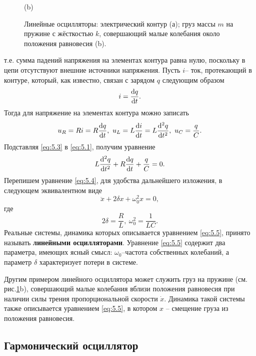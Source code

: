 \begin{figure}[h!]
\begin{minipage}{0.45\linewidth}
                (b)      
        \end{minipage}
        \caption{Линейные осцилляторы: электрический контур (а); груз массы $m$ на пружине с жёсткостью $k$, совершающий малые колебания около положения равновесия (b).}
        \label{fig:5.1}
\end{figure}
т.е. сумма падений напряжения на элементах контура равна нулю, поскольку в цепи отсутствуют внешние источники напряжения. Пусть $i$-- ток, протекающий в контуре, который, как известно, связан с зарядом $q$ следующим образом
\begin{equation}
        \label{eq:5.2}
        i = \dv{q}{t}.
\end{equation}
Тогда для напряжение на элементах контура можно записать
\begin{equation}
        \label{eq:5.3}
        u_R = Ri = R \dv{q}{t}, ~ u_L = L \dv{i}{t} = L \dv[2]{q}{t},~ u_C= \frac{q}{C}.
\end{equation}
Подставляя \eqref{eq:5.3} в \eqref{eq:5.1}, получим уравнение
\begin{equation}
        \label{eq:5.4}
        L\dv[2]{q}{t} + R \dv{q}{t} + \frac{q}{C} = 0.
\end{equation}
Перепишем уравнение \eqref{eq:5.4}, для удобства дальнейшего изложения, в следующем эквивалентном виде
\begin{equation}
        \label{eq:5.5}
        \ddot x + 2 \delta x + \omega_0^2 x =0,
\end{equation}
где 
\begin{equation}
        \label{eq:}
        2 \delta = \frac{R}{L}, ~ \omega_0^2=\frac{1}{LC}.
\end{equation}
Реальные системы, динамика которых описывается уравнением \eqref{eq:5.5}, принято называть
\textbf{линейными осцилляторами}. Уравнение \eqref{eq:5.5} содержит два параметра, имеющих ясный смысл: $\omega_0$--частота собственных колебаний, а параметр $\delta$ характеризует потери в системе.

Другим примером линейного осциллятора может служить груз на пружине (см. рис.\ref{fig:5.1}b), совершающий малые колебания вблизи положения равновесия при наличии силы трения пропорциональной скорости $\dot x$. Динамика такой системы также описывается уравнением \eqref{eq:5.5}, в котором $x$ -- смещение груза из положения равновесия.

\subsection{Гармонический осциллятор}%
\label{sub:5.1.1}

